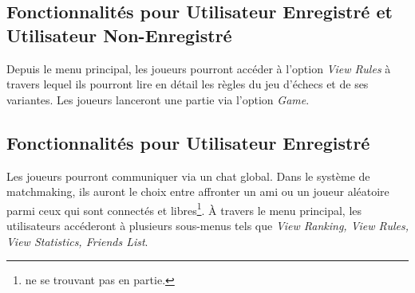 \documentclass[10pt, a4paper]{article}
\begin{document}
			\subsection{Fonctionnalités pour Utilisateur Enregistré et Utilisateur Non-Enregistré}Depuis le menu principal, les joueurs pourront accéder à l'option {\itshape View Rules} à travers lequel ils pourront lire en détail les règles du jeu d'échecs et de ses variantes. Les joueurs lanceront une partie via l'option {\itshape Game}. %

			\subsection{Fonctionnalités pour Utilisateur Enregistré}Les joueurs pourront communiquer via un chat global. Dans le système de matchmaking, ils auront le choix entre affronter un ami ou un joueur aléatoire parmi ceux qui sont connectés et libres\footnote{ne se trouvant pas en partie.}. À travers le menu principal, les utilisateurs accéderont à plusieurs sous-menus tels que {\itshape View Ranking, View Rules, View Statistics, Friends List}.%
\end{document}

